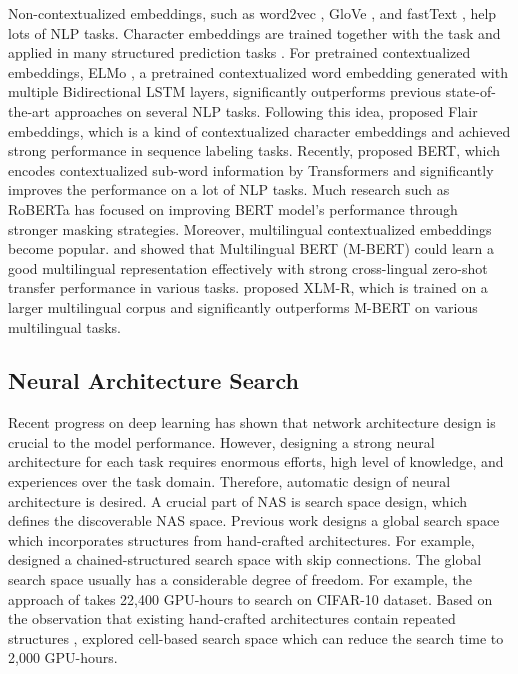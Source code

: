 \documentclass[11pt,a4paper]{article}
\begin{document}
Non-contextualized embeddings, such as word2vec \citep{mikolov2013distributed}, GloVe \citep{pennington2014glove}, and fastText \citep{bojanowski2017enriching}, help lots of NLP tasks. 
Character embeddings \citep{santos2014learning} are trained together with the task and applied in many structured prediction tasks \citep{ma-hovy-2016-end,lample-etal-2016-neural,dozat-manning-2018-simpler}. 
For pretrained contextualized embeddings, ELMo \citep{peters-etal-2018-deep}, a pretrained contextualized word embedding generated with multiple Bidirectional LSTM layers, significantly outperforms previous state-of-the-art approaches on several NLP tasks. 
Following this idea, \citet{akbik-etal-2018-contextual} proposed Flair embeddings, which is a kind of contextualized character embeddings and achieved strong performance in sequence labeling tasks. 
Recently, \citet{devlin-etal-2019-bert} proposed BERT, which encodes contextualized sub-word information by Transformers \citep{vaswani2017attention} and significantly improves the performance on a lot of NLP tasks. 
Much research such as RoBERTa \citep{liu2019roberta} has focused on improving BERT model's performance through stronger masking strategies. Moreover, multilingual contextualized embeddings become popular. \citet{pires-etal-2019-multilingual} and \citet{wu-dredze-2019-beto} showed that Multilingual BERT (M-BERT) could learn a good multilingual representation effectively with strong cross-lingual zero-shot transfer performance in various tasks. \citet{conneau-etal-2020-unsupervised} proposed XLM-R, which is trained on a larger multilingual corpus and significantly outperforms M-BERT on various multilingual tasks.

\subsection{Neural Architecture Search}
Recent progress on deep learning has shown that network architecture design is crucial to the model performance. 
However, designing a strong neural architecture for each task requires enormous efforts, high level of knowledge, and experiences over the task domain. 
Therefore, automatic design of neural architecture is desired. 
A crucial part of NAS is search space design, which defines the discoverable NAS space. 
Previous work \citep{baker2016designing,zoph2016neural,xie2017genetic} designs a global search space \citep{elsken2019neural} which incorporates structures from hand-crafted architectures. For example, \citet{zoph2016neural} designed a chained-structured search space with skip connections. 
The global search space usually has a considerable degree of freedom. For example, the approach of \citet{zoph2016neural} takes 22,400 GPU-hours to search on CIFAR-10 dataset. Based on the observation that existing hand-crafted architectures contain repeated structures \citep{szegedy2016rethinking,he2016deep,huang2017densely}, \citet{zoph2018learning} explored cell-based search space which can reduce the search time to 2,000 GPU-hours. 
\end{document}
